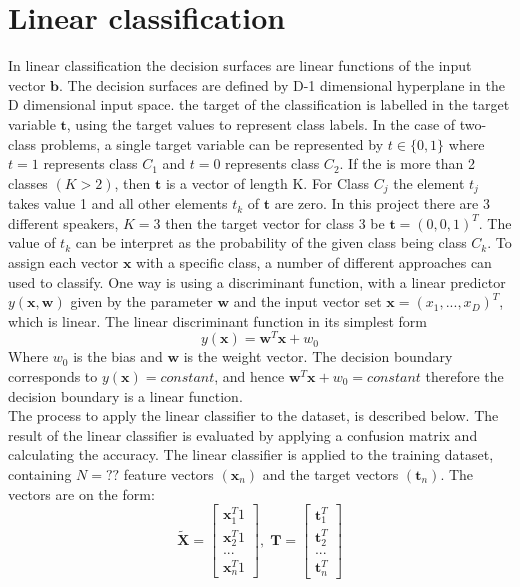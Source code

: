\chapter{Linear classification}
In linear classification the decision surfaces are linear functions of the input vector $\mathbf{b}$. 
The decision surfaces are defined by D-1 dimensional hyperplane in the D dimensional input space.
the target of the classification is labelled in the target variable $\mathbf{t}$, using the target values to represent class labels. 
In the case of two-class problems, a single target variable can be represented by $t\in \lbrace 0,1\rbrace$ where $t = 1$ represents class $C_1$ and $t = 0$ represents class $C_2$.
If the is more than 2 classes $(K>2)$, then $\mathbf{t}$ is a vector of length K.
For Class $C_j$ the element $t_j$ takes value 1 and all other elements $t_k$ of $\mathbf{t}$ are zero.
In this project there are 3 different speakers, $K = 3$ then the target vector for class 3 be $\mathbf{t} = (0, 0, 1)^T$.
The value of $t_k$ can be interpret as the probability of the given class being class $C_k$.
To assign each vector $\mathbf{x}$ with a specific class, a number of different approaches can used to classify.
One way is using a discriminant function, with a linear predictor $y(\mathbf{x},\mathbf{w})$ given by the parameter $\mathbf{w}$ and the input vector set $\mathbf{x}=(x_1,...,x_D)^T$, which is linear. 
The linear discriminant function in its simplest form
\begin{equation}
y(\mathbf{x}) = \mathbf{w}^T \mathbf{x}+w_0
\label{eq:lineDis}
\end{equation}
Where $w_0$ is the bias and $\mathbf{w}$ is the weight vector.
The decision boundary corresponds to $y(\mathbf{x})=constant$, and hence $\mathbf{w}^T \mathbf{x}+w_0 = constant$ therefore the decision boundary is a linear function.
\\
The process to apply the linear classifier to the dataset, is described below. 
The result of the linear classifier is evaluated by applying a confusion matrix and calculating the accuracy. 
The linear classifier is applied to the training dataset, containing $N =??$ feature vectors $(\mathbf{x}_n)$ and the target vectors $(\mathbf{t}_n)$.
The vectors are on the form:
\begin{equation}
\mathbf{\tilde{X}}=\left[ \begin{array}{c}\mathbf{x}_1^T 1\\
\mathbf{x}_2^T 1\\
...\\ 
\mathbf{x}_n^T 1 \end{array} \right],
\;
\mathbf{T}=\left[ \begin{array}{c}
\mathbf{t}_1^T\\ 
\mathbf{t}_2^T\\ 
...\\
\mathbf{t}_n^T
\end{array} \right]
\label{eq:linearVectors}  
\end{equation} 

